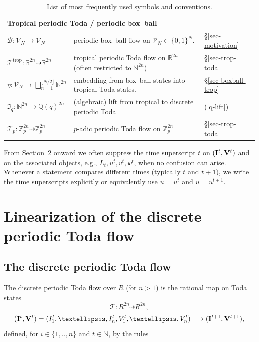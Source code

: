 \documentclass[11pt, a4paper]{amsart}
\newcommand{\eqst}[1]{\begin{equation*}#1\end{equation*}}
\theoremstyle{plain}
\numberwithin{equation}{section}
\begin{document}
\begin{table}[H]
\begin{tabular}{p{} p{} p{}}
\multicolumn{3}{l}{\textbf{Tropical periodic Toda / periodic box--ball}}\\
$\mathcal B:\mathcal V_N\to \mathcal V_N$ & periodic box--ball flow on $\mathcal V_N\subset\{0,1\}^N$. & \hyperref[sec-motivation]{\S\ref*{sec-motivation}} \\
$\mathcal T^{\mathrm{trop}} : \mathbb R ^{2n} \dashrightarrow \mathbb R ^{2n} $ & tropical periodic Toda flow on $\mathbb R^{2n}$ (often restricted to $\mathbb N^{2n}$)& \hyperref[sec-trop-toda]{\S\ref*{sec-trop-toda}} \\
$\eta : \mathcal V_N \longrightarrow \bigsqcup _{n=1}^{\lfloor N/2 \rfloor}\mathbb N^{2n} $ & embedding from box--ball states into tropical Toda states. & \hyperref[sec-boxball-trop]{\S\ref*{sec-boxball-trop}} \\
$\mathfrak I_q:\mathbb N^{2n}\to\mathbb Q(q)^{2n}$ & (algebraic) lift from tropical to discrete periodic Toda & \hyperref[q-lift]{(\ref*{q-lift})} \\
$\mathcal T_p : \mathbb Z_p ^{2n} \dashrightarrow \mathbb Z_p ^{2n} $ & $p$-adic periodic Toda flow on $\mathbb Z_p ^{2n}$& \hyperref[sec-trop-toda]{\S\ref*{sec-trop-toda}} \\
\hline
\end{tabular}
\captionsetup{font=small}
\caption{List of most frequently used symbols and conventions.}
\end{table}
\vspace{-4pt}
\noindent From Section~2 onward we often suppress the time superscript $t$ on $(\bold I ^t, \bold V^t)$ and on the associated objects, e.g., $L_t,u^t,v^t,w^t$, when no confusion can arise.
Whenever a statement compares different times (typically $t$ and $t+1$), we write the time superscripts explicitly or equivalently use $u = u^t$ and $\overline u=u^{t+1}$.



\section{Linearization of the discrete periodic Toda flow}
\subsection{The discrete periodic Toda flow}
\label{sec-dptoda}
The discrete periodic Toda flow over $R$ (for $n > 1$) is the rational map on Toda states \eqst{\mathcal T : R^{2n} \dashrightarrow R^{2n},} \eqst{ (\bold I ^t,\bold V^t) = (I_1^t,\dots,I_n^t,V_1^t,\dots,V_n^t) \longmapsto ( \bold I ^{t+1}, \bold V ^{t+1}),} defined, for $i \in \{1,..,n\}$ and $t \in \mathbb N$, by the rules 
\end{document}
